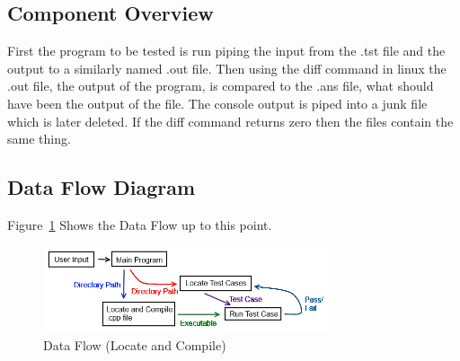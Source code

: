 \subsection{Component  Overview}
First the program to be tested is run piping the input from the .tst file and the output to a similarly named .out file.
Then using the diff command in linux the .out file, the output of the program, is compared to the .ans file, what should
have been the output of the file.  The console output is piped into a junk file which is later deleted.  If the diff command
returns zero then the files contain the same thing.

\subsection{Data Flow Diagram}
Figure~\ref{DataFlow3} Shows the Data Flow up to this point.

\begin{figure}[tbh]
\begin{center}
\includegraphics[width=0.75\textwidth]{./DataFlow3}
\end{center}
\caption{Data Flow (Locate and Compile) \label{DataFlow3}}
\end{figure}


